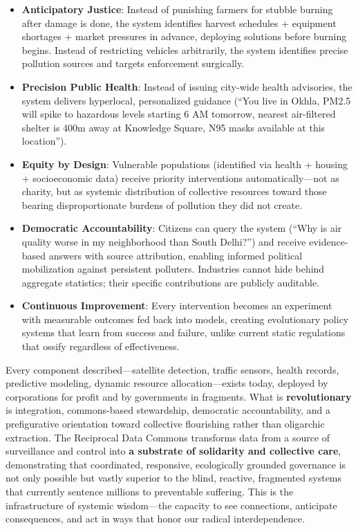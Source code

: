 \begin{itemize}
\item
  \textbf{Anticipatory Justice}: Instead of punishing farmers for
  stubble burning after damage is done, the system identifies harvest
  schedules + equipment shortages + market pressures in advance,
  deploying solutions before burning begins. Instead of restricting
  vehicles arbitrarily, the system identifies precise pollution sources
  and targets enforcement surgically.
\item
  \textbf{Precision Public Health}: Instead of issuing city-wide health
  advisories, the system delivers hyperlocal, personalized guidance
  (``You live in Okhla, PM2.5 will spike to hazardous levels starting 6
  AM tomorrow, nearest air-filtered shelter is 400m away at Knowledge
  Square, N95 masks available at this location'').
\item
  \textbf{Equity by Design}: Vulnerable populations (identified via
  health + housing + socioeconomic data) receive priority interventions
  automatically---not as charity, but as systemic distribution of
  collective resources toward those bearing disproportionate burdens of
  pollution they did not create.
\item
  \textbf{Democratic Accountability}: Citizens can query the system
  (``Why is air quality worse in my neighborhood than South Delhi?'')
  and receive evidence-based answers with source attribution, enabling
  informed political mobilization against persistent polluters.
  Industries cannot hide behind aggregate statistics; their specific
  contributions are publicly auditable.
\item
  \textbf{Continuous Improvement}: Every intervention becomes an
  experiment with measurable outcomes fed back into models, creating
  evolutionary policy systems that learn from success and failure,
  unlike current static regulations that ossify regardless of
  effectiveness.
\end{itemize}

Every component described---satellite detection, traffic sensors, health
records, predictive modeling, dynamic resource allocation---exists
today, deployed by corporations for profit and by governments in
fragments. What is \textbf{revolutionary} is integration, commons-based
stewardship, democratic accountability, and a prefigurative orientation
toward collective flourishing rather than oligarchic extraction. The
Reciprocal Data Commons transforms data from a source of surveillance
and control into \textbf{a substrate of solidarity and collective care},
demonstrating that coordinated, responsive, ecologically grounded
governance is not only possible but vastly superior to the blind,
reactive, fragmented systems that currently sentence millions to
preventable suffering. This is the infrastructure of systemic
wisdom---the capacity to see connections, anticipate consequences, and
act in ways that honor our radical interdependence.

